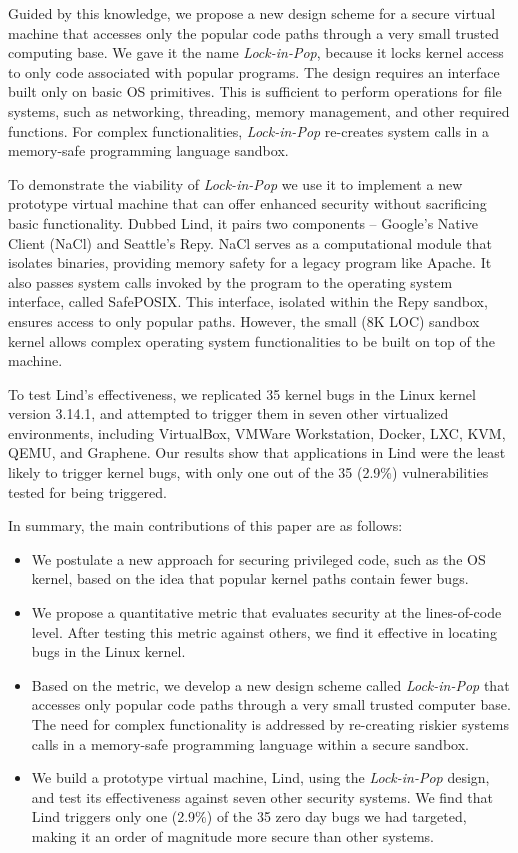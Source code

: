 Guided by this knowledge, we propose a new design scheme for a secure virtual machine that
accesses only the popular code paths through a very small trusted computing base.
We gave it the name \emph{Lock-in-Pop}, because it locks kernel access to only code
associated with popular programs. The design
requires an interface built only on basic OS primitives. This is sufficient to
perform operations for file systems, such as
networking, threading, memory management, and other required functions.
For complex functionalities,  \emph{Lock-in-Pop} re-creates system calls in
a memory-safe programming language sandbox.

To demonstrate the viability of \emph{Lock-in-Pop} we use it to implement a new
prototype virtual machine that can offer enhanced security without sacrificing
 basic functionality. Dubbed Lind, it pairs two components -- Google's Native Client
(NaCl) and Seattle's Repy. NaCl serves as a computational module that isolates
binaries, providing memory
safety for a legacy program like Apache. It also passes system calls invoked by
the program to the operating system interface, called SafePOSIX. This interface,
isolated within the Repy
sandbox, ensures access to only popular paths. However, the small (8K LOC) sandbox
kernel allows complex operating system functionalities to be built on top of the machine.

To test Lind's effectiveness, we replicated 35 kernel bugs in the Linux kernel
version 3.14.1,
and attempted to trigger them in seven other virtualized environments,
including VirtualBox, VMWare Workstation,
Docker, LXC, KVM, QEMU, and Graphene.
Our results show that applications in Lind were the least likely to trigger kernel bugs,
with only one out of the 35 (2.9\%) vulnerabilities tested for being triggered.

In summary, the main contributions of this paper are as follows:

\begin{itemize}\setlength\itemsep{0em}
\item
We postulate a new approach for securing privileged code,
such as the OS kernel, based on the idea that popular kernel paths contain fewer bugs.

\item
We propose a quantitative metric that evaluates security
 at the lines-of-code level.
After testing this metric against others, we find it effective in locating
 bugs in the Linux kernel.

\item
Based on the metric, we develop a new design scheme called \emph{Lock-in-Pop} that
accesses only popular code paths
through a very small trusted computer base.
The need for complex functionality is addressed by re-creating riskier systems calls
in a memory-safe programming language within a secure sandbox.

\item
We build a prototype virtual machine, Lind, using the \emph{Lock-in-Pop} design,
 and test its effectiveness against seven other security systems. We find that
 Lind triggers only one
(2.9\%) of the 35 zero day bugs we had targeted,
making it an order of magnitude more secure than other systems.
\end{itemize}

